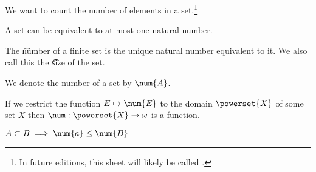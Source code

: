 

We want to count the number of elements in a set.\footnote{In future editions, this sheet will likely be called .}


\begin{proposition}
A set can be equivalent to at most one natural number.
\end{proposition}

The \t{number} of a finite set is the unique natural number equivalent to it.
We also call this the \t{size} of the set.



We denote the number of a set by $\num{A}$.


If we restrict the function $E \mapsto \num{E}$ to the domain $\powerset{X}$ of some set $X$ then $\num: \powerset{X} \to \omega$ is a function.


\begin{proposition}
	$A \subset B \implies \num{a} \leq \num{B}$
\end{proposition}





\blankpage
